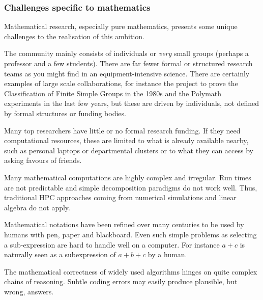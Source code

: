 \subsubsection{Challenges specific to  mathematics}

Mathematical research, especially pure mathematics, presents some
unique challenges to the realisation of this ambition.


\begin{compactitem}
\item The community mainly consists of individuals or \textit{very} small
  groups (perhaps a professor and a few students). There are far fewer formal or structured research
  teams as you might find in an equipment-intensive science. There are
  certainly examples of large scale collaborations, for instance the
  project to prove the Classification of Finite Simple Groups in the
  1980s and the Polymath experiments in the last few years,
  but these are driven by individuals, not defined by formal
  structures or funding bodies.
\item Many top researchers have little or no formal research
  funding. If they need computational resources, these are limited to what 
  is already available nearby, such as personal laptops or
  departmental clusters or to what they can access by asking favours
  of friends.
\item Many mathematical computations are highly complex and irregular.
  Run times are not predictable and simple decomposition paradigms do
  not work well. Thus,
  traditional HPC approaches coming from numerical simulations and linear algebra do not apply.
\item Mathematical notations have been refined over many centuries to be
  used by humans with pen, paper and blackboard. Even such simple
  problems as selecting a sub-expression are hard to handle well on a
  computer. For instance $a+c$ is naturally seen as a subexpression of
  $a+b+c$ by a human.
\item The mathematical correctness of widely used algorithms hinges on
  quite complex chains of reasoning. Subtle coding errors may easily
  produce plausible, but wrong, answers.


\end{compactitem}
